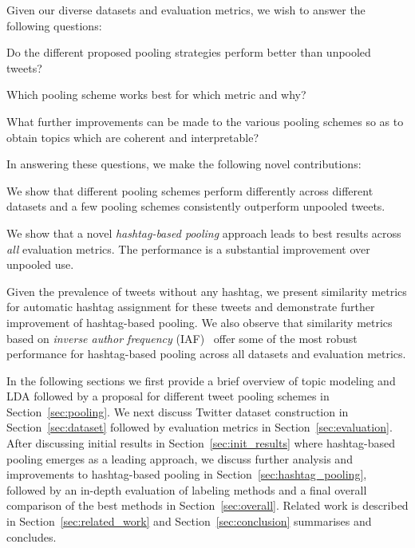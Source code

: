 \documentclass[10pt,a5paper,twoside]{article}
\begin{document}
Given our diverse datasets and evaluation metrics, we wish to answer
the following questions:
\begin{compactitem}
\item Do the different proposed pooling strategies perform better than
  unpooled tweets?
\item Which pooling scheme works best for which metric and why?
\item What further improvements can be made to the various pooling schemes
  so as to obtain topics which are coherent and interpretable?
\end{compactitem}
In answering these questions, we make the following novel
contributions:
\begin{compactitem}
\item We show that different pooling schemes perform differently
  across different datasets and a few pooling schemes consistently
  outperform unpooled tweets.
\item We show that a novel \emph{hashtag-based pooling} approach leads
  to best results across \emph{all} evaluation metrics.  The
  performance is a substantial improvement over unpooled use.
\item Given the prevalence of tweets without any hashtag, we present
  similarity metrics for automatic hashtag assignment for these tweets and
  demonstrate further improvement of hashtag-based pooling.  
  We also observe that 
  similarity metrics based on \emph{inverse author frequency}
  (IAF)~\cite{iaf} offer some of the most robust performance for 
  hashtag-based pooling across all datasets and evaluation metrics.
\end{compactitem}

In the following sections we first provide a brief overview of topic
modeling and LDA followed by a proposal for different tweet pooling
schemes in Section~\ref{sec:pooling}.  We next discuss Twitter dataset
construction in Section~\ref{sec:dataset} followed by evaluation
metrics in Section~\ref{sec:evaluation}.  After discussing initial
results in Section~\ref{sec:init_results} where hashtag-based pooling
emerges as a leading approach, we discuss further analysis and
improvements to hashtag-based pooling in
Section~\ref{sec:hashtag_pooling}, followed by an in-depth evaluation
of labeling methods and a final overall comparison of the best methods
in Section~\ref{sec:overall}.  Related work is described in
Section~\ref{sec:related_work} and Section~\ref{sec:conclusion}
summarises and concludes.
\end{document}
